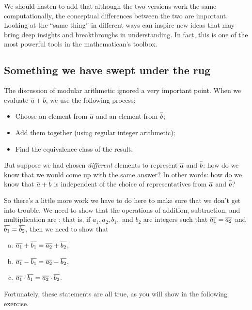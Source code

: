 We should hasten to add that although the two versions work the same computationally, the conceptual differences between the two are important. Looking at the ``same thing'' in different ways can inspire new ideas that may bring deep insights and breakthroughs in understanding.  In fact, this is one of the most powerful tools in the mathematican's toolbox. 

\subsection{Something we have swept under the rug} \label{subsec:EquivalenceRelations:ModularArithmetic:WellDefSect}

The discussion of modular arithmetic ignored a very important point. When we evaluate $\overline{a} \mathbin{+} \overline{b}$, we use the following process:
\begin{itemize}
\item
Choose an element from  $\overline{a}$ and an element from $\overline{b}$;
\item
Add them together (using regular integer arithmetic);
\item
Find the equivalence class of the result. 
\end{itemize}

But suppose we had chosen \emph{different} elements to represent $\overline{a}$ and $\overline{b}$: how do we know that we would come up with the same answer? In other words: how do we know that $\overline{a} \mathbin{+} \overline{b}$ is independent of the choice of representatives from $\overline{a}$ and $\overline{b}$?

So there's a little more work we have to do here to make sure that we don't get into trouble. We need to show that  the operations of addition, subtraction, and multiplication are : that is, if $a_1, a_2, b_1,$ and $b_2$ are integers such that  $\overline{a_1} = \overline{a_2}$ and $\overline{b_1} = \overline{b_2}$, then we need to show that
\begin{enumerate}[(a)]
\item $\overline{a_1} \mathbin{+} \overline{b_1} = \overline{a_2} \mathbin{+} \overline{b_2}$,
\item $\overline{a_1} \mathbin{-} \overline{b_1} = \overline{a_2} \mathbin{-} \overline{b_2}$, 
\item $\overline{a_1} \cdot \overline{b_1} = \overline{a_2} \cdot \overline{b_2}$.
\end{enumerate}
Fortunately, these statements are all true, as you will show in the following exercise.

